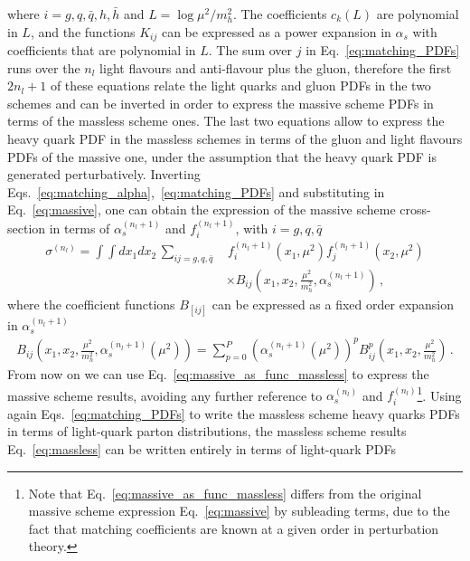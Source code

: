 where $i = g, q, \bar{q}, h, \bar{h}$ and $L = \log \mu^2/m_h^2$. The coefficients $c_k\left(L\right)$ are polynomial in $L$,
and the functions $K_{ij}$ can be expressed as a power expansion in $\alpha_s$ with coefficients
that are polynomial in $L$. The sum over $j$ in Eq.~\eqref{eq:matching_PDFs}
runs over the $n_l$ light flavours and anti-flavour plus the gluon, therefore the first $2n_l+1$
of these equations relate the light quarks and gluon PDFs in the two schemes and can be inverted in
order to express the massive scheme PDFs in terms of the massless scheme ones. The last two equations
allow to express the heavy quark PDF in the massless schemes in terms of the gluon and light flavours PDFs of the massive one,
under the assumption that the heavy quark PDF is generated perturbatively.
%
Inverting Eqs.~\eqref{eq:matching_alpha},~\eqref{eq:matching_PDFs} and substituting in Eq.~\eqref{eq:massive},
one can obtain the expression of the massive scheme cross-section in terms of $\alpha_s^{(n_l+1)}$
and $f_i^{(n_l+1)}$, with $i = g,q,\bar{q}$
\begin{align}
    \label{eq:massive_as_func_massless}
    \sigma^{(n_l)} = \int \int dx_1 dx_2\, \sum_{ij = g,q,\bar{q} }&\, 
    f_i^{(n_l+1)}\left(x_1,\mu^2\right)f_j^{(n_l+1)}\left(x_2,\mu^2\right) \nonumber \\
    &\times B_{ij}\left(x_1,x_2,\frac{\mu^2}{m_h^2},\alpha_s^{(n_l+1)}\right)\,,
\end{align}
where the coefficient functions $B_[ij]$ can be expressed as a fixed order expansion in $\alpha_s^{(n_l+1)}$
\begin{align}
    \label{eq:massive_1}
    B_{ij}\left(x_1,x_2,\frac{\mu^2}{m_h^2},\alpha_s^{(n_l+1)}\left(\mu^2\right)\right)
    = \sum_{p=0}^P \left(\alpha_s^{(n_l+1)}\left(\mu^2\right)\right)^p B_{ij}^p\left(x_1,x_2,\frac{\mu^2}{m_h^2}\right)\,.
\end{align}
From now on we can use Eq.~\eqref{eq:massive_as_func_massless} to express the massive scheme results, avoiding
any further reference to $\alpha_s^{(n_l)}$ and $f_i^{(n_l)}$\footnote{Note that Eq.~\eqref{eq:massive_as_func_massless}
differs from the original massive scheme expression Eq.~\eqref{eq:massive} by subleading terms,
due to the fact that matching coefficients are known at a given order in perturbation theory.}.
Using again Eqs.~\eqref{eq:matching_PDFs} to write the massless scheme heavy quarks PDFs in terms of light-quark parton
distributions, the massless scheme results Eq.~\eqref{eq:massless} can be written entirely in terms of 
light-quark PDFs
